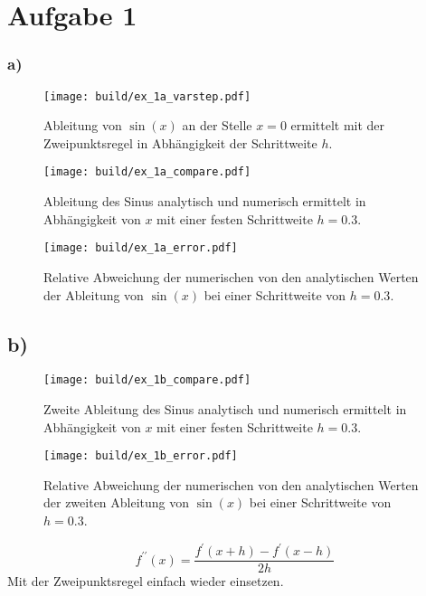 \section*{Aufgabe 1}
\subsubsection*{a)}
\begin{figure}
    \centering
    \texttt{[image: build/ex\_1a\_varstep.pdf]}
    \caption{Ableitung von $\sin(x)$ an der Stelle $x=0$ ermittelt mit der Zweipunktsregel
    in Abhängigkeit der Schrittweite $h$.}
    \label{fig:h_dep}
\end{figure}

\begin{figure}
    \centering
    \texttt{[image: build/ex\_1a\_compare.pdf]}
    \caption{Ableitung des Sinus analytisch und numerisch ermittelt in Abhängigkeit von 
    $x$ mit einer festen Schrittweite $h=0.3$.}
    \label{fig:a_comp}
\end{figure}

\begin{figure}
    \centering
    \texttt{[image: build/ex\_1a\_error.pdf]}
    \caption{Relative Abweichung der numerischen von den analytischen Werten der Ableitung von $\sin(x)$
    bei einer Schrittweite von $h=0.3$.}
    \label{fig:rel_a}
\end{figure}
\FloatBarrier

\subsection*{b)}
\begin{figure}
    \centering
    \texttt{[image: build/ex\_1b\_compare.pdf]}
    \caption{Zweite Ableitung des Sinus analytisch und numerisch ermittelt in Abhängigkeit von 
    $x$ mit einer festen Schrittweite $h=0.3$.}
    \label{fig:b_comp}
\end{figure}

\begin{figure}
    \centering
    \texttt{[image: build/ex\_1b\_error.pdf]}
    \caption{Relative Abweichung der numerischen von den analytischen Werten der zweiten Ableitung von $\sin(x)$
    bei einer Schrittweite von $h=0.3$.}
    \label{fig:rel_b}
\end{figure}

\begin{equation*}
    f^{\prime \prime} (x) = \frac{f^{\prime}(x+h) - f^{\prime}(x-h)}{2h}    
\end{equation*}
Mit der Zweipunktsregel einfach wieder einsetzen.

